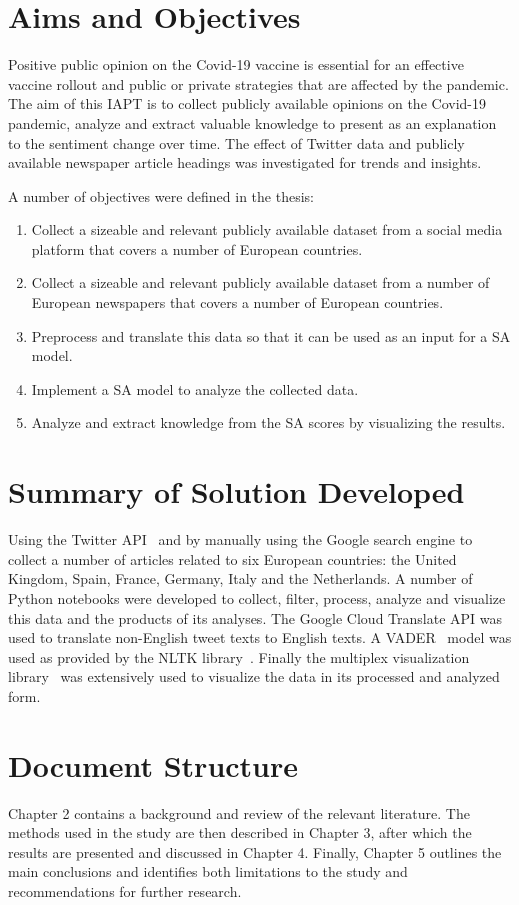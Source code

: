 \section{Aims and Objectives}

Positive public opinion on the Covid-19 vaccine is essential for an effective vaccine rollout and public or private strategies that are affected by the pandemic.
The aim of this \ac{IAPT} is to collect publicly available opinions on the Covid-19 pandemic, analyze and extract valuable knowledge to present as an explanation to the sentiment change over time.
The effect of Twitter data and publicly available newspaper article headings was investigated for trends and insights.

\noindent A number of objectives were defined in the thesis:

\begin{enumerate}
  \item Collect a sizeable and relevant publicly available dataset from a social media platform that covers a number of European countries.
  \item Collect a sizeable and relevant publicly available dataset from a number of European newspapers that covers a number of European countries.
  \item Preprocess and translate this data so that it can be used as an input for a \ac{SA} model.
  \item Implement a \ac{SA} model to analyze the collected data.
  \item Analyze and extract knowledge from the \ac{SA} scores by visualizing the results.
\end{enumerate}

\section{Summary of Solution Developed}

Using the Twitter \ac{API}~\citep{roesslein2020tweepy} and by manually using the Google search engine to collect a number of articles related to six European countries: the United Kingdom, Spain, France, Germany, Italy and the Netherlands.
A number of Python notebooks were developed to collect, filter, process, analyze and visualize this data and the products of its analyses.
The Google Cloud Translate \ac{API} was used to translate non-English tweet texts to English texts.
A \ac{VADER}~\citep{Hutto_Gilbert_2014} model was used as provided by the \ac{NLTK} library~\citep{bird2009natural}.
Finally the multiplex visualization library~\citep{Mamo2021} was extensively used to visualize the data in its processed and analyzed form.


\section{Document Structure}

Chapter 2 contains a background and review of the relevant literature.
The methods used in the study are then described in Chapter 3, after which the results are presented and discussed in Chapter 4.
Finally, Chapter 5 outlines the main conclusions and identifies both limitations to the study and recommendations for further research.

